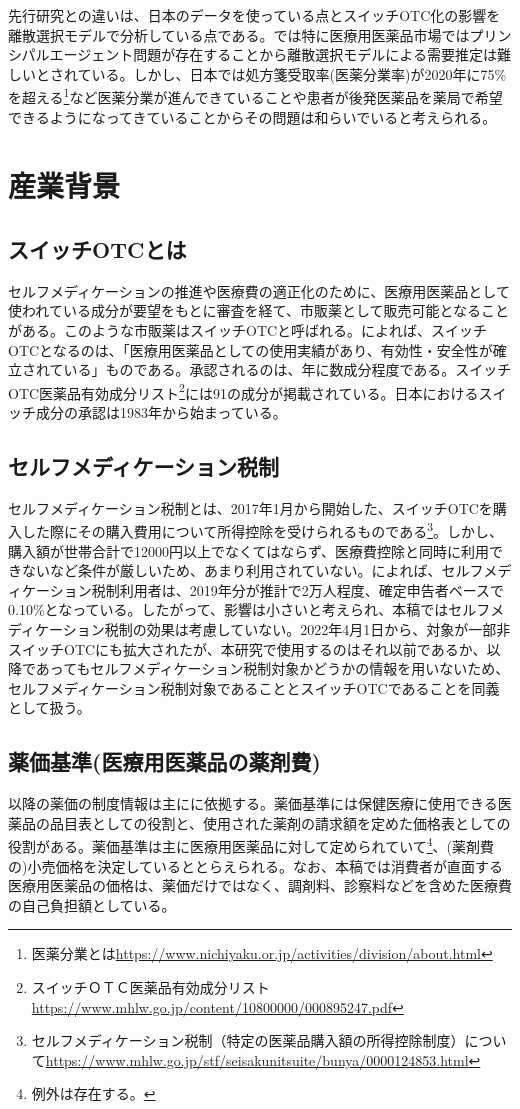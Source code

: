 \documentclass[a4paper,11pt,uplatex]{jsarticle}
\theoremstyle{definition}
\begin{document}
先行研究との違いは、日本のデータを使っている点とスイッチOTC化の影響を離散選択モデルで分析している点である。\cite{JLE2002}では特に医療用医薬品市場ではプリンシパルエージェント問題が存在することから離散選択モデルによる需要推定は難しいとされている。しかし、日本では処方箋受取率(医薬分業率)が2020年に75\%を超える\footnote{医薬分業とは\url{https://www.nichiyaku.or.jp/activities/division/about.html}}など医薬分業が進んできていることや患者が後発医薬品を薬局で希望できるようになってきていることからその問題は和らいでいると考えられる。
\section{産業背景} 
\subsection{スイッチOTCとは}
セルフメディケーションの推進や医療費の適正化のために、医療用医薬品として使われている成分が要望をもとに審査を経て、市販薬として販売可能となることがある。このような市販薬はスイッチOTCと呼ばれる。\cite{jmsi2020}によれば、スイッチOTCとなるのは、「医療用医薬品としての使用実績があり、有効性・安全性が確立されている」ものである。承認されるのは、年に数成分程度である。スイッチOTC医薬品有効成分リスト\footnote{スイッチＯＴＣ医薬品有効成分リスト\url{https://www.mhlw.go.jp/content/10800000/000895247.pdf}}には91の成分が掲載されている。日本におけるスイッチ成分の承認は1983年から始まっている。
\subsection{セルフメディケーション税制}
セルフメディケーション税制とは、2017年1月から開始した、スイッチOTCを購入した際にその購入費用について所得控除を受けられるものである\footnote{セルフメディケーション税制（特定の医薬品購入額の所得控除制度）について\url{https://www.mhlw.go.jp/stf/seisakunitsuite/bunya/0000124853.html}}。しかし、購入額が世帯合計で12000円以上でなくてはならず、医療費控除と同時に利用できないなど条件が厳しいため、あまり利用されていない。\cite{jmsi2021}によれば、セルフメディケーション税制利用者は、2019年分が推計で2万人程度、確定申告者ベースで0.10\%となっている。したがって、影響は小さいと考えられ、本稿ではセルフメディケーション税制の効果は考慮していない。2022年4月1日から、対象が一部非スイッチOTCにも拡大されたが、本研究で使用するのはそれ以前であるか、以降であってもセルフメディケーション税制対象かどうかの情報を用いないため、セルフメディケーション税制対象であることとスイッチOTCであることを同義として扱う。
\subsection{薬価基準(医療用医薬品の薬剤費)}
以降の薬価の制度情報は主に\cite{takahashi}に依拠する。薬価基準には保健医療に使用できる医薬品の品目表としての役割と、使用された薬剤の請求額を定めた価格表としての役割がある。薬価基準は主に医療用医薬品に対して定められていて\footnote{例外は存在する。}、(薬剤費の)小売価格を決定しているととらえられる。なお、本稿では消費者が直面する医療用医薬品の価格は、薬価だけではなく、調剤料、診察料などを含めた医療費の自己負担額としている。
\end{document}
